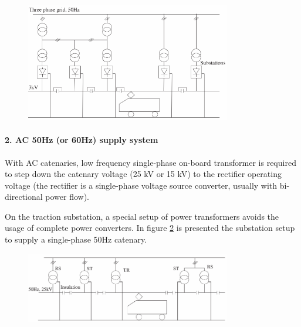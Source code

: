 \begin{figure}[h!]
	\centering
	\begin{minipage}{.6\textwidth}
		\centering
		\includegraphics[width=0.8\textwidth,keepaspectratio]{figures/31.PowerS/abad2016f}
		\label{fig:abad2016f}
	\end{minipage}
\end{figure}




\paragraph{2. AC 50Hz (or 60Hz) supply system\\}

With AC catenaries, low frequency single-phase on-board transformer is required to step down the catenary voltage (25 kV or 15 kV) to the rectifier operating voltage (the rectifier is a single-phase voltage source converter, usually with bi-directional power flow).

On the traction substation, a special setup of power transformers avoids the usage of complete power converters. In figure \ref{fig:abad2016d} is presented the substation setup to supply a single-phase 50Hz catenary.

\begin{figure}[h!]
	\centering
	\begin{minipage}{.6\textwidth}
		\centering
		\includegraphics[width=0.8\textwidth,keepaspectratio]{figures/31.PowerS/abad2016d}
		\label{fig:abad2016d}
	\end{minipage}
\end{figure}


